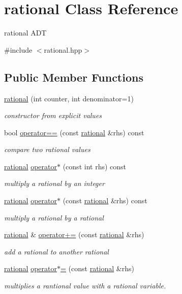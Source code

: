 \hypertarget{classrational}{}\section{rational Class Reference}
\label{classrational}


rational A\+DT  




{\ttfamily \#include $<$rational.\+hpp$>$}

\subsection*{Public Member Functions}
\begin{DoxyCompactItemize}
\item 
\hyperlink{classrational_a5f971ef33181044f54d8e4fee71cb957}{rational} (int counter, int denominator=1)
\begin{DoxyCompactList}\small\item\em constructor from explicit values \end{DoxyCompactList}\item 
bool \hyperlink{classrational_a5f9a93cc7fd6309f5eae4c76d81f28d5}{operator==} (const \hyperlink{classrational}{rational} \&rhs) const 
\begin{DoxyCompactList}\small\item\em compare two rational values \end{DoxyCompactList}\item 
\hyperlink{classrational}{rational} \hyperlink{classrational_acbaf4f76b2caf4aafb850202e29d69ce}{operator$\ast$} (const int rhs) const 
\begin{DoxyCompactList}\small\item\em multiply a rational by an integer \end{DoxyCompactList}\item 
\hyperlink{classrational}{rational} \hyperlink{classrational_a13f267e5cdafffcc44203762548bb5cd}{operator$\ast$} (const \hyperlink{classrational}{rational} \&rhs) const 
\begin{DoxyCompactList}\small\item\em multiply a rational by a rational \end{DoxyCompactList}\item 
\hyperlink{classrational}{rational} \& \hyperlink{classrational_a9b83ad0c803d2ac242b42e71d954a356}{operator+=} (const \hyperlink{classrational}{rational} \&rhs)
\begin{DoxyCompactList}\small\item\em add a rational to another rational \end{DoxyCompactList}\item 
\hyperlink{classrational}{rational} \hyperlink{classrational_a2b5729aef261d16cd18ff7c7fcbf8c6e}{operator$\ast$=} (const \hyperlink{classrational}{rational} \&rhs)
\begin{DoxyCompactList}\small\item\em multiplies a rantional value with a rational variable. \end{DoxyCompactList}\end{DoxyCompactItemize}

